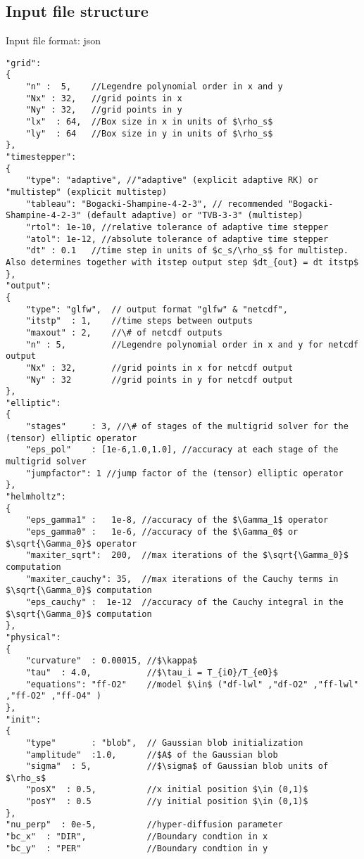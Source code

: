 \subsection{Input file structure}
Input file format: json
\begin{verbatim}
"grid":
{
    "n" :  5,    //Legendre polynomial order in x and y 
    "Nx" : 32,   //grid points in x
    "Ny" : 32,   //grid points in y
    "lx"  : 64,  //Box size in x in units of $\rho_s$
    "ly"  : 64   //Box size in y in units of $\rho_s$
},
"timestepper":
{
    "type": "adaptive", //"adaptive" (explicit adaptive RK) or "multistep" (explicit multistep)
    "tableau": "Bogacki-Shampine-4-2-3", // recommended "Bogacki-Shampine-4-2-3" (default adaptive) or "TVB-3-3" (multistep)
    "rtol": 1e-10, //relative tolerance of adaptive time stepper
    "atol": 1e-12, //absolute tolerance of adaptive time stepper
    "dt" : 0.1   //time step in units of $c_s/\rho_s$ for multistep. Also determines together with itstep output step $dt_{out} = dt itstp$
},
"output":
{
    "type": "glfw",  // output format "glfw" & "netcdf",
    "itstp"  : 1,    //time steps between outputs
    "maxout" : 2,    //\# of netcdf outputs
    "n" : 5,         //Legendre polynomial order in x and y for netcdf output
    "Nx" : 32,       //grid points in x for netcdf output
    "Ny" : 32        //grid points in y for netcdf output
},    
"elliptic":
{
    "stages"     : 3, //\# of stages of the multigrid solver for the (tensor) elliptic operator
    "eps_pol"    : [1e-6,1.0,1.0], //accuracy at each stage of the multigrid solver
    "jumpfactor": 1 //jump factor of the (tensor) elliptic operator
},
"helmholtz":
{
    "eps_gamma1" :   1e-8, //accuracy of the $\Gamma_1$ operator
    "eps_gamma0" :   1e-6, //accuracy of the $\Gamma_0$ or $\sqrt{\Gamma_0}$ operator
    "maxiter_sqrt":  200,  //max iterations of the $\sqrt{\Gamma_0}$ computation
    "maxiter_cauchy": 35,  //max iterations of the Cauchy terms in $\sqrt{\Gamma_0}$ computation
    "eps_cauchy" :  1e-12  //accuracy of the Cauchy integral in the $\sqrt{\Gamma_0}$ computation
},
"physical":
{
    "curvature"  : 0.00015, //$\kappa$
    "tau"  : 4.0,           //$\tau_i = T_{i0}/T_{e0}$
    "equations": "ff-O2"    //model $\in$ ("df-lwl" ,"df-O2" ,"ff-lwl" ,"ff-O2" ,"ff-O4" )
},
"init":
{
    "type"       : "blob",  // Gaussian blob initialization
    "amplitude"  :1.0,      //$A$ of the Gaussian blob
    "sigma"  : 5,           //$\sigma$ of Gaussian blob units of $\rho_s$
    "posX"  : 0.5,          //x initial position $\in (0,1)$
    "posY"  : 0.5           //y initial position $\in (0,1)$
},
"nu_perp"  : 0e-5,          //hyper-diffusion parameter
"bc_x"  : "DIR",            //Boundary condtion in x
"bc_y"  : "PER"             //Boundary condtion in y
\end{verbatim}
